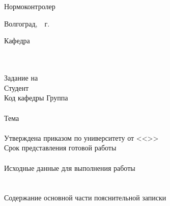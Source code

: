 {{\hfill
{}\\
\vspace{\fill}\\
Нормоконтролер 
\hfill
{}\\
\vspace{\fill}
\begin{center}
Волгоград,~\the\year~г.
\end{center}
\newpage
{
\clearpage
\thispagestyle{empty}
\begin{center}
\VSTUTitleHeading
\end{center}
\begin{center}
Кафедра~\VSTUDepartment
\end{center}
\vfill
\hfill\VSTUTitleHeadApproval
\vspace{\fill}
\\\\Задание на \\
Студент \\
Код кафедры \uline{\makebox[4cm]{\VSTUDepartmentCode}} \hfill Группа \uline{\makebox[4cm]{\VSTUStudentGroup}}\\
\vspace{1mm}\\
Тема \VSTUTitleUL\\
\\Утверждена приказом по университету от <<\uline{\makebox[0.5cm]{\VSTUOrderDate}}>> \uline{\makebox[1.8cm]{\VSTUOrderMonth}} \uline{\makebox[1.2cm]{\VSTUOrderYear}} \textnumero\uline{\makebox[1.9cm]{\VSTUOrderNumber}}\\
Срок представления готовой работы \\
\\Исходные данные для выполнения работы\\
\VSTUInitialDataUL\\
\vspace{4mm}\\
Содержание основной части пояснительной записки
{\small
\VSTUPZContents
}
\thispagestyle{empty}
\addtocounter{page}{-1}
}}}
